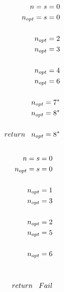 \documentclass[11pt]{article}
\begin{document}
\begin{minipage}{0.5\textwidth}
	\subsection{}
	\begin{align*}
		n=s=0\\
		n_{opt}=s=0\\\\
		n_{opt}=2\\
		n_{opt}=3\\\\
		n_{opt}=4\\
		n_{opt}=6\\\\
		n_{opt}=7^*\\
		n_{opt}=8^*\\\\
		return\hspace{0.3cm}n_{opt}=8^*
	\end{align*}
\end{minipage}
\begin{minipage}{0.5\textwidth}
	\subsection{}
	\begin{align*}
		n=s=0\\
		n_{opt}=s=0\\\\
		n_{opt}=1\\
		n_{opt}=3\\\\
		n_{opt}=2\\
		n_{opt}=5\\\\
		n_{opt}=6\\\\\\
		return\hspace{0.3cm}Fail
	\end{align*}
\end{minipage}
\end{document}
